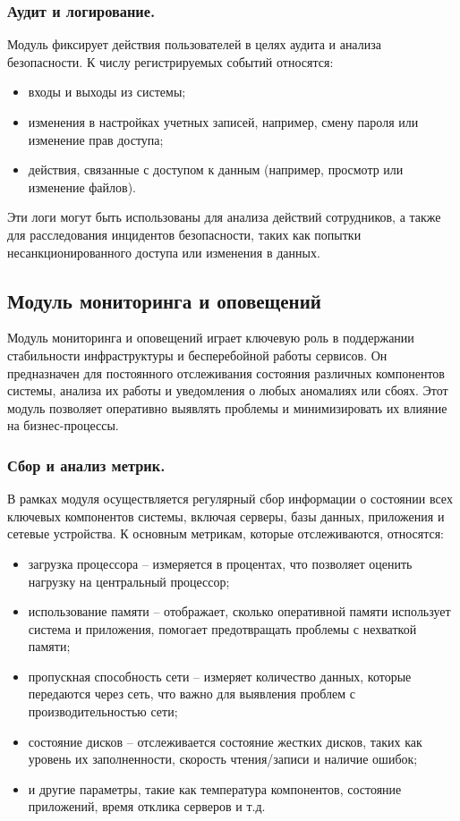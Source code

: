 \subsubsection{Аудит и логирование.}
Модуль фиксирует действия пользователей в целях аудита и анализа безопасности. К числу регистрируемых событий относятся:
\begin{itemize}
    \item входы и выходы из системы;
    \item изменения в настройках учетных записей, например, смену пароля или изменение прав доступа;
    \item действия, связанные с доступом к данным (например, просмотр или изменение файлов).
\end{itemize}

Эти логи могут быть использованы для анализа действий сотрудников, а также для расследования инцидентов безопасности, таких как попытки несанкционированного доступа или изменения в данных.


\subsection{Модуль мониторинга и оповещений}
\label{sec:monitoring_alerting_functionality}

Модуль мониторинга и оповещений играет ключевую роль в поддержании стабильности инфраструктуры и бесперебойной работы сервисов. Он предназначен для постоянного отслеживания состояния различных компонентов системы, анализа их работы и уведомления о любых аномалиях или сбоях. Этот модуль позволяет оперативно выявлять проблемы и минимизировать их влияние на бизнес-процессы.

\subsubsection{Сбор и анализ метрик.}  
В рамках модуля осуществляется регулярный сбор информации о состоянии всех ключевых компонентов системы, включая серверы, базы данных, приложения и сетевые устройства. К основным метрикам, которые отслеживаются, относятся:

\begin{itemize}
    \item загрузка процессора -- измеряется в процентах, что позволяет оценить нагрузку на центральный процессор;
    \item использование памяти -- отображает, сколько оперативной памяти использует система и приложения, помогает предотвращать проблемы с нехваткой памяти;
    \item пропускная способность сети -- измеряет количество данных, которые передаются через сеть, что важно для выявления проблем с производительностью сети;
    \item состояние дисков -- отслеживается состояние жестких дисков, таких как уровень их заполненности, скорость чтения/записи и наличие ошибок;
    \item и другие параметры, такие как температура компонентов, состояние приложений, время отклика серверов и т.д.
\end{itemize}

